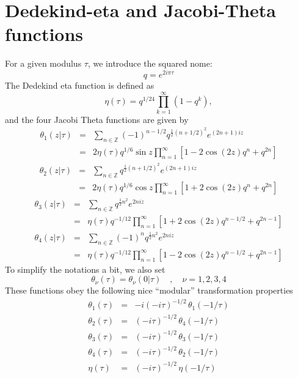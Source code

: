 \documentclass[11pt]{iopart}
\begin{document}
\section[\;\;\;\;\;\;\;\;\;\;\;\;\;\;Dedekind-eta and Jacobi-Theta functions]{Dedekind-eta and Jacobi-Theta functions}
\label{sec:CFT_Jacobi}

For a given modulus $\tau$, we introduce the squared nome:
\begin{equation}
 q=e^{2i\pi \tau}
\end{equation}
The Dedekind eta function is defined as 
\begin{equation}\label{eq:eta_def}
 \eta(\tau)=q^{1/ 24}\prod_{k=1}^{\infty}\left(1-q^k\right),
\end{equation}
and the four Jacobi Theta functions are given by
\begin{eqnarray}\label{eq:theta1_def}
 \theta_1(z|\tau)&=&\sum_{n \in \mathbb{Z}}(-1)^{n-1/2}q^{\frac{1}{2}(n+1/2)^2}e^{(2n+1)iz}\\
 &=&2\eta(\tau)q^{1/6} \sin z\prod_{n=1}^{\infty} \left[1-2 \cos(2z) q^{n}+q^{2n}\right]
\end{eqnarray}
\begin{eqnarray}\label{eq:theta2_def}
 \theta_2(z|\tau)&=&\sum_{n \in \mathbb{Z}}q^{\frac{1}{2}(n+1/2)^2}e^{(2n+1)iz}\\
 &=&2\eta(\tau)q^{1/6} \cos z\prod_{n=1}^{\infty} \left[1+2 \cos(2z) q^{n}+q^{2n}\right]
\end{eqnarray}
\begin{eqnarray}\label{eq:theta3_def}
 \theta_3(z|\tau)&=&\sum_{n \in \mathbb{Z}}q^{\frac{1}{2}n^2}e^{2niz}\\
 &=&\eta(\tau)q^{-1/12}\prod_{n=1}^{\infty} \left[1+2 \cos(2z) q^{n-1/2}+q^{2n-1}\right]
\end{eqnarray}
\begin{eqnarray}\label{eq:theta4_def}
 \theta_4(z|\tau)&=&\sum_{n \in \mathbb{Z}}(-1)^{n}q^{\frac{1}{2}n^2}e^{2niz}\\
 &=&\eta(\tau)q^{-1/12}\prod_{n=1}^{\infty} \left[1-2 \cos(2z) q^{n-1/2}+q^{2n-1}\right]
\end{eqnarray}
To simplify the notations a bit, we also set
\begin{equation}\label{eq:thetas}
 \theta_\nu(\tau)=\theta_\nu (0|\tau)\quad,\quad \nu=1,2,3,4
\end{equation}
These functions obey the following nice ``modular'' transformation properties
\begin{eqnarray}
 \theta_1(\tau)&=&-i (-i \tau )^{-1/2}\,\theta_1(-1/\tau)\\
 \theta_2(\tau)&=&(-i \tau )^{-1/2}\,\theta_4(-1/\tau)\\\label{eq:modtheta3}
 \theta_3(\tau)&=&(-i \tau )^{-1/2}\,\theta_3(-1/\tau)\\\label{eq:modtheta4}
 \theta_4(\tau)&=&(-i \tau )^{-1/2}\,\theta_2(-1/\tau)\\\label{eq:modeta}
 \eta(\tau)&=&(-i \tau )^{-1/2}\,\eta(-1/\tau)
\end{eqnarray}
\end{document}
